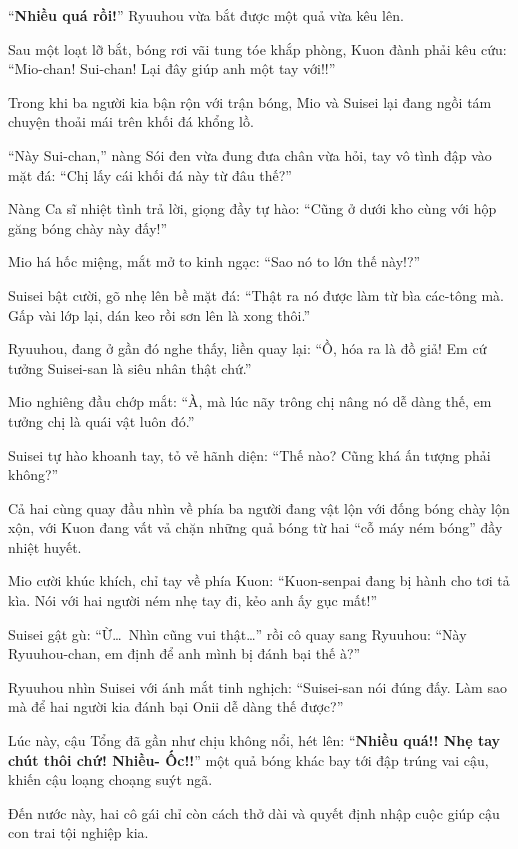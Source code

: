 \documentclass[../main.tex]{subfiles}
\begin{document}
``\textbf{Nhiều quá rồi!}'' Ryuuhou vừa bắt được một quả vừa kêu lên.

Sau một loạt lỡ bắt, bóng rơi vãi tung tóe khắp phòng, Kuon đành phải kêu cứu: ``Mio-chan! Sui-chan! Lại đây giúp anh một tay với!!''

Trong khi ba người kia bận rộn với trận bóng, Mio và Suisei lại đang ngồi tám chuyện thoải mái trên khối đá khổng lồ.

``Này Sui-chan,'' nàng Sói đen vừa đung đưa chân vừa hỏi, tay vô tình đập vào mặt đá: ``Chị lấy cái khối đá này từ đâu thế?''

Nàng Ca sĩ nhiệt tình trả lời, giọng đầy tự hào: ``Cũng ở dưới kho cùng với hộp găng bóng chày này đấy!''

Mio há hốc miệng, mắt mở to kinh ngạc: ``Sao nó to lớn thế này!?''

Suisei bật cười, gõ nhẹ lên bề mặt đá: ``Thật ra nó được làm từ bìa các-tông mà. Gấp vài lớp lại, dán keo rồi sơn lên là xong thôi.''

Ryuuhou, đang ở gần đó nghe thấy, liền quay lại: ``Ồ, hóa ra là đồ giả! Em cứ tưởng Suisei-san là siêu nhân thật chứ.''

Mio nghiêng đầu chớp mắt: ``À, mà lúc nãy trông chị nâng nó dễ dàng thế, em tưởng chị là quái vật luôn đó.''

Suisei tự hào khoanh tay, tỏ vẻ hãnh diện: ``Thế nào? Cũng khá ấn tượng phải không?''

Cả hai cùng quay đầu nhìn về phía ba người đang vật lộn với đống bóng chày lộn xộn, với Kuon đang vất vả chặn những quả bóng từ hai ``cỗ máy ném bóng'' đầy nhiệt huyết.

Mio cười khúc khích, chỉ tay về phía Kuon: ``Kuon-senpai đang bị hành cho tơi tả kìa. Nói với hai người ném nhẹ tay đi, kẻo anh ấy gục mất!''

Suisei gật gù: ``Ừ\dots\ Nhìn cũng vui thật\dots'' rồi cô quay sang Ryuuhou: ``Này Ryuuhou-chan, em định để anh mình bị đánh bại thế à?''

Ryuuhou nhìn Suisei với ánh mắt tinh nghịch: ``Suisei-san nói đúng đấy. Làm sao mà để hai người kia đánh bại Onii dễ dàng thế được?''

Lúc này, cậu Tổng đã gần như chịu không nổi, hét lên: ``\textbf{Nhiều quá!! Nhẹ tay chút thôi chứ! Nhiều- Ốc!!}'' một quả bóng khác bay tới đập trúng vai cậu, khiến cậu loạng choạng suýt ngã.

Đến nước này, hai cô gái chỉ còn cách thở dài và quyết định nhập cuộc giúp cậu con trai tội nghiệp kia.
\end{document}
